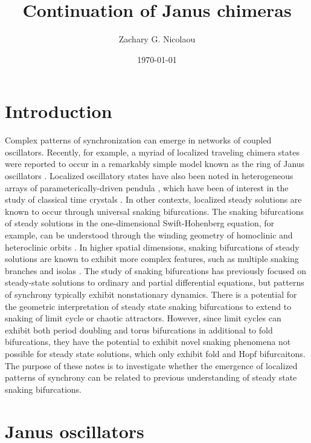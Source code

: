 \documentclass[aps,pre,amsmath,amssymb,floatfix,onecolumn,notitlepage,10pt]{revtex4-1}
\begin{document}
\title{Continuation of Janus chimeras}
\author{Zachary G. Nicolaou}
\date{\today}

\maketitle

\section{Introduction}
Complex patterns of synchronization can emerge in networks of coupled oscillators.  Recently, for example, a myriad of localized traveling chimera states were reported to occur in a remarkably simple model known as the ring of Janus oscillators \cite{2019_Nicolaou}. Localized oscillatory states have also been noted in heterogeneous arrays of parameterically-driven pendula \cite{2021_Nicolaou_1}, which have been of interest in the study of classical time crystals \cite{2021_Nicolaou_2}.  In other contexts, localized steady solutions are known to occur through universal snaking bifurcations. The snaking bifurcations of steady solutions in the one-dimensional Swift-Hohenberg equation, for example, can be understood through the winding geometry of homoclinic and heteroclinic orbits \cite{2006_burke, 2009_beck}. In higher spatial dimensions, snaking bifurcations of steady solutions are known to exhibit  more complex features, such as multiple snaking branches and isolas \cite{2019_bramburger,2020_bramburger}. The study of snaking bifurcations has previously focused on steady-state solutions to ordinary and partial differential equations, but patterns of synchrony typically exhibit nonstationary dynamics.  There is a potential for the geometric interpretation of steady state snaking bifurcations to extend to snaking of limit cycle or chaotic attractors. However, since limit cycles can exhibit both period doubling and torus bifurcations in additional to fold bifurcations, they have the potential to exhibit novel snaking phenomena not possible for steady state solutions, which only exhibit fold and Hopf bifurcaitons.  The purpose of these notes is to investigate whether the emergence of localized patterns of synchrony can be related to previous understanding of steady state snaking bifurcations.

\section{Janus oscillators}
\end{document}
